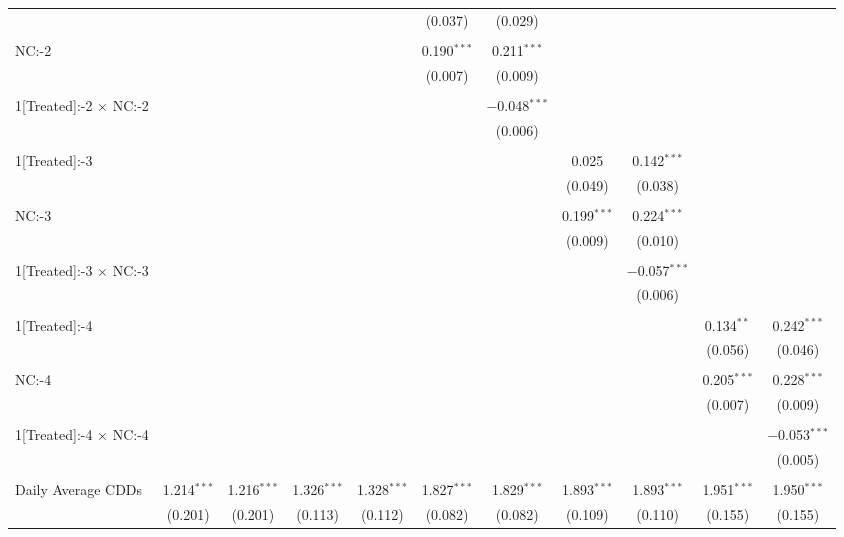 \begin{table}[!htbp]
\begin{tabular}{@{\extracolsep{5pt}}lcccccccccc}
  &  &  &  &  & (0.037) & (0.029) &  &  &  &  \\ 
  & & & & & & & & & & \\ 
 NC:-2 &  &  &  &  & 0.190$^{***}$ & 0.211$^{***}$ &  &  &  &  \\ 
  &  &  &  &  & (0.007) & (0.009) &  &  &  &  \\ 
  & & & & & & & & & & \\ 
 1[Treated]:-2 $\times$ NC:-2 &  &  &  &  &  & $-$0.048$^{***}$ &  &  &  &  \\ 
  &  &  &  &  &  & (0.006) &  &  &  &  \\ 
  & & & & & & & & & & \\ 
 1[Treated]:-3 &  &  &  &  &  &  & 0.025 & 0.142$^{***}$ &  &  \\ 
  &  &  &  &  &  &  & (0.049) & (0.038) &  &  \\ 
  & & & & & & & & & & \\ 
 NC:-3 &  &  &  &  &  &  & 0.199$^{***}$ & 0.224$^{***}$ &  &  \\ 
  &  &  &  &  &  &  & (0.009) & (0.010) &  &  \\ 
  & & & & & & & & & & \\ 
 1[Treated]:-3 $\times$ NC:-3 &  &  &  &  &  &  &  & $-$0.057$^{***}$ &  &  \\ 
  &  &  &  &  &  &  &  & (0.006) &  &  \\ 
  & & & & & & & & & & \\ 
 1[Treated]:-4 &  &  &  &  &  &  &  &  & 0.134$^{**}$ & 0.242$^{***}$ \\ 
  &  &  &  &  &  &  &  &  & (0.056) & (0.046) \\ 
  & & & & & & & & & & \\ 
 NC:-4 &  &  &  &  &  &  &  &  & 0.205$^{***}$ & 0.228$^{***}$ \\ 
  &  &  &  &  &  &  &  &  & (0.007) & (0.009) \\ 
  & & & & & & & & & & \\ 
 1[Treated]:-4 $\times$ NC:-4 &  &  &  &  &  &  &  &  &  & $-$0.053$^{***}$ \\ 
  &  &  &  &  &  &  &  &  &  & (0.005) \\ 
  & & & & & & & & & & \\ 
 Daily Average CDDs & 1.214$^{***}$ & 1.216$^{***}$ & 1.326$^{***}$ & 1.328$^{***}$ & 1.827$^{***}$ & 1.829$^{***}$ & 1.893$^{***}$ & 1.893$^{***}$ & 1.951$^{***}$ & 1.950$^{***}$ \\ 
  & (0.201) & (0.201) & (0.113) & (0.112) & (0.082) & (0.082) & (0.109) & (0.110) & (0.155) & (0.155) \\ 

\end{tabular}
\end{table}
